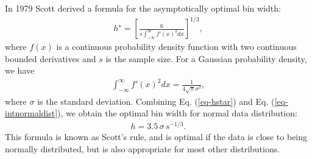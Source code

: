 \documentclass[
reprint,
superscriptaddress,
showpacs,
amsmath,
amssymb,
aps,
pra,
longbibliography
]{revtex4-1}
\begin{document}
In 1979 Scott derived a formula for the asymptotically optimal bin width:
\begin{eqnarray}
h^{\star} = \left[ \frac{6}{s \int_{-\infty}^{\infty} f'(x)^2 dx} \right]^{1/3},
\label{eq-hstar}
\end{eqnarray}
where $f(x)$ is a continuous probability density function with two
continuous bounded derivatives and $s$ is the sample size. For a Gaussian probability density, we have
\begin{eqnarray}
\int_{-\infty}^{\infty} f'(x)^2 dx = \frac{1}{4 \sqrt{\pi} \sigma ^3},
\label{eq-intnormaldist}
\end{eqnarray}
where $\sigma$ is the standard deviation. Combining Eq. (\ref{eq-hstar}) and Eq. (\ref{eq-intnormaldist}), we obtain the 
optimal bin width for normal data distribution:
\begin{eqnarray}
h = 3.5 \, \sigma \, s^{-1/3}.
\end{eqnarray}
This formula is known as Scott's rule, and is optimal if the data is close to being normally distributed, but is also 
appropriate for most other distributions.
\end{document}
